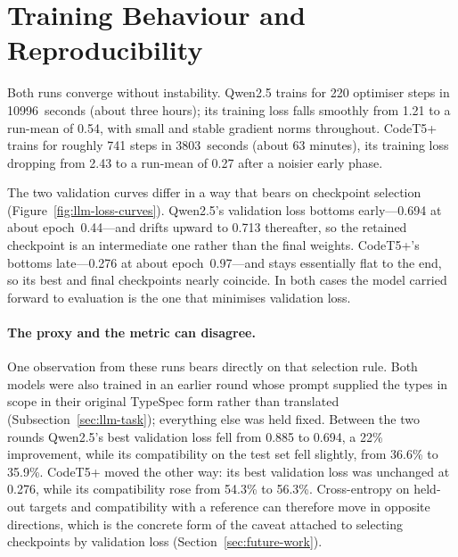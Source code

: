 \section{Training Behaviour and Reproducibility}
\label{sec:llm-repro}
Both runs converge without instability.
Qwen2.5 trains for \num{220} optimiser steps in \num{10996}~seconds (about three hours); its training loss falls smoothly from \num{1.21} to a run-mean of \num{0.54}, with small and stable gradient norms throughout.
CodeT5+ trains for roughly \num{741} steps in \num{3803}~seconds (about \num{63} minutes), its training loss dropping from \num{2.43} to a run-mean of \num{0.27} after a noisier early phase.

The two validation curves differ in a way that bears on checkpoint selection (Figure~\ref{fig:llm-loss-curves}).
Qwen2.5's validation loss bottoms early---\num{0.694} at about epoch~\num{0.44}---and drifts upward to \num{0.713} thereafter, so the retained checkpoint is an intermediate one rather than the final weights.
CodeT5+'s bottoms late---\num{0.276} at about epoch~\num{0.97}---and stays essentially flat to the end, so its best and final checkpoints nearly coincide.
In both cases the model carried forward to evaluation is the one that minimises validation loss.

\paragraph{The proxy and the metric can disagree.}
One observation from these runs bears directly on that selection rule.
Both models were also trained in an earlier round whose prompt supplied the types in scope in their original TypeSpec form rather than translated (Subsection~\ref{sec:llm-task}); everything else was held fixed.
Between the two rounds Qwen2.5's best validation loss fell from \num{0.885} to \num{0.694}, a \num{22}\% improvement, while its compatibility on the test set fell slightly, from \num{36.6}\% to \num{35.9}\%.
CodeT5+ moved the other way: its best validation loss was unchanged at \num{0.276}, while its compatibility rose from \num{54.3}\% to \num{56.3}\%.
Cross-entropy on held-out targets and compatibility with a reference can therefore move in opposite directions, which is the concrete form of the caveat attached to selecting checkpoints by validation loss (Section~\ref{sec:future-work}).

